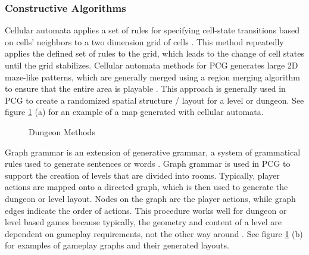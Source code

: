 \documentclass[11pt, oneside]{article}
\begin{document}
\begin{normalsize}
\subsubsection{Constructive Algorithms}
Cellular automata applies a set of rules for specifying cell-state transitions based on cells' neighbors to a two dimension grid of cells \cite{adams2017procedural}. This method repeatedly applies the defined set of rules to the grid, which leads to the change of cell states until the grid stabilizes. Cellular automata methods for PCG generates large 2D maze-like patterns, which are generally merged using a region merging algorithm to ensure that the entire area is playable \cite{adams2017procedural}. This approach is generally used in PCG to create a randomized spatial structure / layout for a level or dungeon. See figure \ref{fig:dungeon} (a) for an example of a map generated with cellular automata.

\begin{figure}[H]%
    \centering
    \qquad
    \caption{Dungeon Methods}%
    \label{fig:dungeon}%
\end{figure}

Graph grammar is an extension of generative grammar, a system of grammatical rules used to generate sentences or words \cite{thompson2017generative}. Graph grammar is used in PCG to support the creation of levels that are divided into rooms. Typically, player actions are mapped onto a directed graph, which is then used to generate the dungeon or level layout. Nodes on the graph are the player actions, while graph edges indicate the order of actions. This procedure works well for dungeon or level based games because typically, the geometry and content of a level are dependent on gameplay requirements, not the other way around \cite{van2013designing}. See figure \ref{fig:dungeon} (b) for examples of gameplay graphs and their generated layouts.


\end{normalsize}
\end{document}
